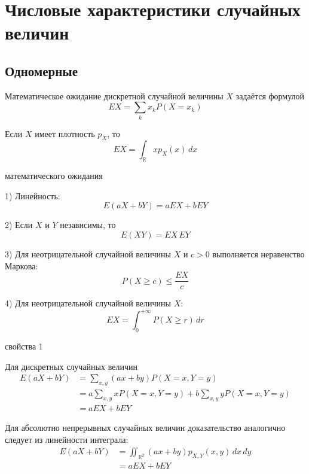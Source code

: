 \documentclass[12pt,a4paper]{article}
\begin{document}
\newpage

\section{Числовые характеристики случайных величин}

\subsection{Одномерные}

\begin{definition}

Математическое ожидание дискретной случайной величины $X$ задаётся формулой
\[
EX
=
\sum_k x_k P(X=x_k)
\]

Если $X$ имеет плотность $p_X$, то
\[
EX
=
\int_{\mathbb{R}}x p_X(x)\,dx
\]

\end{definition}

\begin{props}{математического ожидания}

1) Линейность:
\[
E(aX+bY)
=
aEX+bEY
\]

\medskip

2) Если $X$ и $Y$ независимы, то
\[
E(XY)
=
EX\,EY
\]

\medskip

3) Для неотрицательной случайной величины $X$ и $c>0$ выполняется неравенство Маркова:
\[
P(X\geq c)
\leq
\frac{EX}{c}
\]

\medskip

4) Для неотрицательной случайной величины $X$:
\[
EX
=
\int_0^{+\infty}P(X\geq r)\,dr
\]

\end{props}

\begin{proofbox}{свойства 1}

Для дискретных случайных величин
\[
\begin{aligned}
E(aX+bY)
&=
\sum_{x,y}(ax+by)P(X=x,Y=y)\\
&=
a\sum_{x,y}xP(X=x,Y=y)
+
b\sum_{x,y}yP(X=x,Y=y)\\
&=
aEX+bEY
\end{aligned}
\]

Для абсолютно непрерывных случайных величин доказательство аналогично следует из линейности интеграла:
\[
\begin{aligned}
E(aX+bY)
&=
\iint_{\mathbb{R}^2}
(ax+by)p_{X,Y}(x,y)\,dx\,dy\\
&=
aEX+bEY
\end{aligned}
\]

\end{proofbox}
\end{document}
